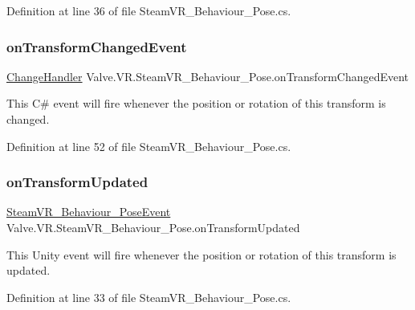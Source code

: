 Definition at line 36 of file Steam\+V\+R\+\_\+\+Behaviour\+\_\+\+Pose.\+cs.

\mbox{\label{class_valve_1_1_v_r_1_1_steam_v_r___behaviour___pose_a2118c47de64b77f157864fb337bdee8b}} 
\subsubsection{\texorpdfstring{onTransformChangedEvent}{onTransformChangedEvent}}
{\footnotesize\ttfamily \mbox{\hyperlink{class_valve_1_1_v_r_1_1_steam_v_r___behaviour___pose_abfdfc35f49754198589572579c59bcc2}{Change\+Handler}} Valve.\+V\+R.\+Steam\+V\+R\+\_\+\+Behaviour\+\_\+\+Pose.\+on\+Transform\+Changed\+Event}



This C\# event will fire whenever the position or rotation of this transform is changed. 



Definition at line 52 of file Steam\+V\+R\+\_\+\+Behaviour\+\_\+\+Pose.\+cs.

\mbox{\label{class_valve_1_1_v_r_1_1_steam_v_r___behaviour___pose_aa26155c725bb61edaebcf529645c77c4}} 
\subsubsection{\texorpdfstring{onTransformUpdated}{onTransformUpdated}}
{\footnotesize\ttfamily \mbox{\hyperlink{class_valve_1_1_v_r_1_1_steam_v_r___behaviour___pose_event}{Steam\+V\+R\+\_\+\+Behaviour\+\_\+\+Pose\+Event}} Valve.\+V\+R.\+Steam\+V\+R\+\_\+\+Behaviour\+\_\+\+Pose.\+on\+Transform\+Updated}



This Unity event will fire whenever the position or rotation of this transform is updated. 



Definition at line 33 of file Steam\+V\+R\+\_\+\+Behaviour\+\_\+\+Pose.\+cs.

